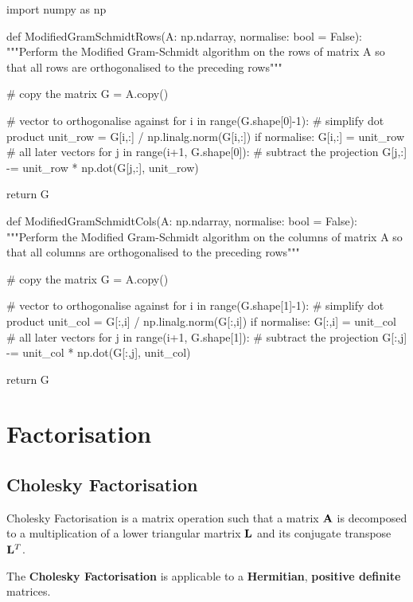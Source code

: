 \begin{python}
import numpy as np

def ModifiedGramSchmidtRows(A: np.ndarray, normalise: bool = False):
    """Perform the Modified Gram-Schmidt algorithm on the rows of matrix A
    so that all rows are orthogonalised to the preceding rows"""

    # copy the matrix
    G = A.copy()

    # vector to orthogonalise against
    for i in range(G.shape[0]-1):
        # simplify dot product
        unit_row = G[i,:] / np.linalg.norm(G[i,:])
        if normalise:
            G[i,:] = unit_row
        # all later vectors
        for j in range(i+1, G.shape[0]):
            # subtract the projection
            G[j,:] -= unit_row * np.dot(G[j,:], unit_row)

    return G

def ModifiedGramSchmidtCols(A: np.ndarray, normalise: bool = False):
    """Perform the Modified Gram-Schmidt algorithm on the columns of matrix A
    so that all columns are orthogonalised to the preceding rows"""

    # copy the matrix
    G = A.copy()

    # vector to orthogonalise against
    for i in range(G.shape[1]-1):
        # simplify dot product
        unit_col = G[:,i] / np.linalg.norm(G[:,i])
        if normalise:
            G[:,i] = unit_col
        # all later vectors
        for j in range(i+1, G.shape[1]):
            # subtract the projection
            G[:,j] -= unit_col * np.dot(G[:,j], unit_col)

    return G
\end{python}


\section{Factorisation}

\subsection{Cholesky Factorisation}

Cholesky Factorisation is a matrix operation such that a matrix $ \mathbf{A} $ is
decomposed to a multiplication of a lower triangular martrix $ \mathbf{L} $ and its
conjugate transpose $ \mathbf{L}^T $.

The \textbf{Cholesky Factorisation} is applicable to a \textbf{Hermitian},
\textbf{positive definite} matrices.

